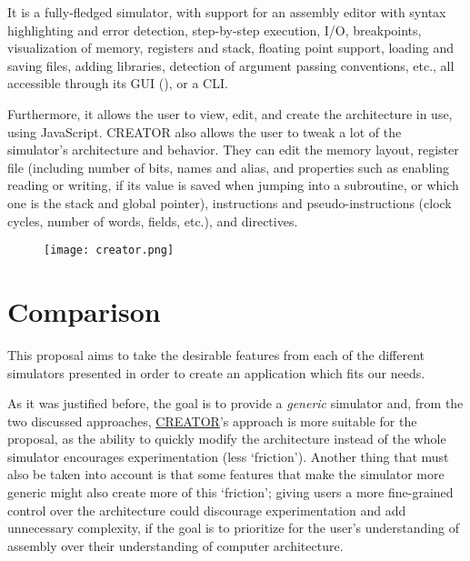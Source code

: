 It is a fully-fledged simulator, with support for an \gls{assembly} editor with syntax highlighting and error detection, step-by-step execution, \gls{I/O}, breakpoints, visualization of \gls{memory}, \glspl{register} and \gls{stack}, floating point support, loading and saving files, adding libraries, detection of argument passing conventions, etc., all accessible through its \gls{GUI} (), or a \gls{CLI}.

Furthermore, it allows the user to view, edit, and create the architecture in use, using JavaScript. CREATOR also allows the user to tweak a lot of the simulator's architecture and behavior. They can edit the \gls{memory} layout, register file (including number of bits, names and alias, and properties such as enabling reading or writing, if its value is saved when jumping into a \gls{subroutine}, or which one is the stack and global pointer), \glspl{instruction} and \glspl{pseudo-instruction} (\glspl{clock cycle}, number of words, fields, etc.), and \glspl{directive}.


\begin{figure}[htb]
    {\texttt{[image: creator.png]}}
\end{figure}



\section{Comparison}\label{sec:comparison}
This proposal aims to take the desirable features from each of the different simulators presented in order to create an application which fits our needs.

As it was justified before, the goal is to provide a \textit{generic} simulator and, from the two discussed approaches, \hyperref[subsubsec:creator]{CREATOR}'s approach is more suitable for the proposal, as the ability to quickly modify the architecture instead of  the whole simulator encourages experimentation (less `friction'). Another thing that must also be taken into account is that some features that make the simulator more generic might also create more of this `friction'; giving users a more fine-grained control over the architecture could discourage experimentation and add unnecessary complexity, if the goal is to prioritize for the user's understanding of \gls{assembly} over their understanding of computer architecture.

